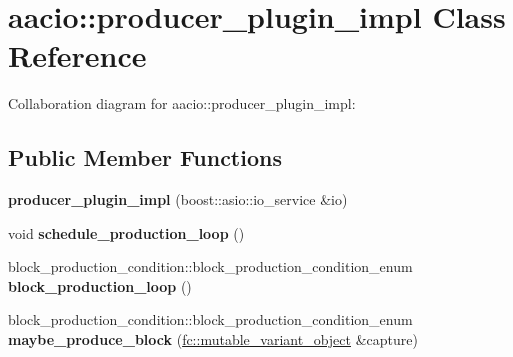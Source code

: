 \hypertarget{classaacio_1_1producer__plugin__impl}{}\section{aacio\+:\+:producer\+\_\+plugin\+\_\+impl Class Reference}
\label{classaacio_1_1producer__plugin__impl}


Collaboration diagram for aacio\+:\+:producer\+\_\+plugin\+\_\+impl\+:
\subsection*{Public Member Functions}
\begin{DoxyCompactItemize}
\item 
\mbox{\label{classaacio_1_1producer__plugin__impl_a3a8c6324583decf47259359f2da1a868}} 
{\bfseries producer\+\_\+plugin\+\_\+impl} (boost\+::asio\+::io\+\_\+service \&io)
\item 
\mbox{\label{classaacio_1_1producer__plugin__impl_a32052da610e0054f927973a04a9d0df9}} 
void {\bfseries schedule\+\_\+production\+\_\+loop} ()
\item 
\mbox{\label{classaacio_1_1producer__plugin__impl_a0065f496c54064c42ea4537aaae15528}} 
block\+\_\+production\+\_\+condition\+::block\+\_\+production\+\_\+condition\+\_\+enum {\bfseries block\+\_\+production\+\_\+loop} ()
\item 
\mbox{\label{classaacio_1_1producer__plugin__impl_a9b713a9f20bcf6cef537134775305292}} 
block\+\_\+production\+\_\+condition\+::block\+\_\+production\+\_\+condition\+\_\+enum {\bfseries maybe\+\_\+produce\+\_\+block} (\mbox{\hyperlink{classfc_1_1mutable__variant__object}{fc\+::mutable\+\_\+variant\+\_\+object}} \&capture)
\end{DoxyCompactItemize}
